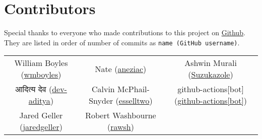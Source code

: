 \section{Contributors}
Special thanks to everyone who made contributions to this project on \href{https://github.com/wmboyles/Math-Summaries}{Github}.
They are listed in order of number of commits as \texttt{name (GitHub username)}.

\begin{center}
    \begin{tabular}{ c c c }
    	William Boyles (\href{https://github.com/wmboyles}{wmboyles}) & Nate (\href{https://github.com/aneziac}{aneziac}) & Ashwin Murali (\href{https://github.com/Suzukazole}{Suzukazole}) \\
		आदित्य देव (\href{https://github.com/dev-aditya}{dev-aditya}) & Calvin McPhail-Snyder (\href{https://github.com/esselltwo}{esselltwo}) & github-actions[bot] (\href{https://github.com/apps/github-actions}{github-actions[bot]}) \\
		Jared Geller (\href{https://github.com/jaredgeller}{jaredgeller}) & Robert Washbourne (\href{https://github.com/rawsh}{rawsh})\end{tabular}
\end{center}
